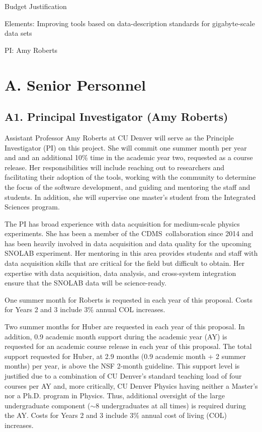 \documentclass[11pt,oneside]{memoir}
\newcommand{\CDMS}{{\small CDMS}}
\begin{document}
\mainmatter
\pagestyle{bodystyle}

\centerline{Budget Justification}
\centerline{Elements: Improving tools based on data-description standards for gigabyte-scale data sets}
\centerline{PI: Amy Roberts}


\section*{A. Senior Personnel}

\subsection*{A1. Principal Investigator (Amy Roberts)}

Assistant Professor Amy Roberts at CU Denver will serve as the Principle Investigator (PI) on this project.  She will commit one summer month per year and and an additional 10\% time in the academic year two, requested as a course release. Her responsibilities will include reaching out to researchers and facilitating their adoption of the tools, working with the community to determine the focus of the software development, and guiding and mentoring the staff and students.  In addition, she will supervise one master's student from the Integrated Sciences program.

The PI has broad experience with data acquisition for medium-scale physics experiments.  She has been a member of the \CDMS\ collaboration since 2014 and has been heavily involved in data acquisition and data quality for the upcoming SNOLAB experiment.  
Her mentoring in this area provides students and staff with data acquisition skills that are critical for the field but difficult to obtain.  Her expertise with data acquisition, data analysis, and cross-system integration ensure that the SNOLAB data will be science-ready.

One summer month for Roberts is requested in each year of this proposal. Costs for Years 2 and 3 include 3\% annual COL increases. 

Two summer months for Huber are requested in each year of this proposal. In addition, 0.9 academic month support during the academic year (AY) is requested for an academic course release in each year of this proposal. The total support requested for Huber, at 2.9 months (0.9 academic month + 2 summer months) per year, is above the NSF 2-month guideline. This support level is justified due to a combination of CU Denver's standard teaching load of four courses per AY and, more critically, CU Denver Physics having neither a Master's nor a Ph.D. program in Physics. Thus, additional oversight of the large undergraduate component ($\sim$8 undergraduates at all times) is required during the AY. Costs for Years 2 and 3 include 3\% annual cost of living (COL) increases. 
\end{document}
